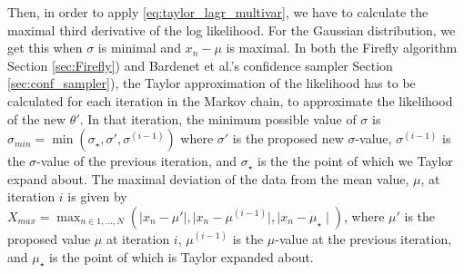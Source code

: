 Then, in order to apply \eqref{eq:taylor_lagr_multivar}, we have to calculate the maximal third derivative of the log likelihood.
For the Gaussian distribution, we get this when $\sigma$ is minimal and $x_n - \mu$ is maximal.
In both the Firefly algorithm Section \ref{sec:Firefly}) and Bardenet et al.'s confidence sampler Section \ref{sec:conf_sampler}), the Taylor approximation of the likelihood has to be calculated for each iteration in the Markov chain, to approximate the likelihood of the new $\theta'$. 
In that iteration, the minimum possible value of $\sigma$ is $\sigma_{min} = \min\left(\sigma_{\star}, \sigma', \sigma^{(i-1)}\right) $ where $\sigma'$ is the proposed new $\sigma$-value, $\sigma^{(i-1)}$ is the $\sigma$-value of the previous iteration, and $\sigma_{\star}$ is the the point of which we Taylor expand about. 
The maximal deviation of the data from the mean value, $\mu$, at iteration $i$ is given by $X_{max} = \max_{n\in 1,\ldots, N} \left(\mid x_n - \mu'\mid, \mid x_n - \mu^{(i-1)}\mid, \mid x_n - \mu_{\star}\mid\right)$, where $\mu'$ is the proposed value $\mu$ at iteration $i$, $\mu^{(i-1)}$ is the $\mu$-value at the previous iteration, and $\mu_{\star}$ is the point of which is Taylor expanded about.  

